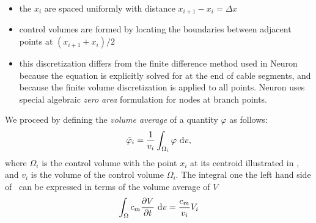 \begin{itemize}
    \item   the $x_i$ are spaced uniformly with distance $x_{i+1}-x_{i} = \Delta x$
    \item   control volumes are formed by locating the boundaries between adjacent points at $(x_{i+1}+x_{i})/2$
    \item   this discretization differs from the finite difference method used in Neuron because the equation is explicitly solved for at the end of cable segments, and because the finite volume discretization is applied to all points. Neuron uses special algebraic \emph{zero area} formulation for nodes at branch points.
\end{itemize}

We proceed by defining the \emph{volume average} of a quantity $\varphi$ as follows:
\begin{equation}
    \bar{\varphi}_i = \frac{1}{v_i} \int_{\Omega_i}{\varphi}~\text{d}{v},
\end{equation}
where $\Omega_i$ is the control volume with the point $x_i$ at its centroid illustrated in , and $v_i$ is the volume of the control volume $\Omega_i$.
The integral one the left hand side of~ can be expressed in terms of the volume average of $V$
\begin{equation}
    \int_{\Omega}{c_m \frac{\partial{V}}{\partial{t}} } ~\text{d}{v} = \frac{c_m}{v_i} V_i
\end{equation}
